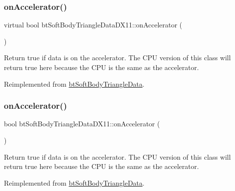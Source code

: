 \subsubsection{\texorpdfstring{on\+Accelerator()}{onAccelerator()}\hspace{0.1cm}{\footnotesize\ttfamily [1/2]}}
{\footnotesize\ttfamily virtual bool bt\+Soft\+Body\+Triangle\+Data\+D\+X11\+::on\+Accelerator (\begin{DoxyParamCaption}{ }\end{DoxyParamCaption})\hspace{0.3cm}{\ttfamily [virtual]}}

Return true if data is on the accelerator. The C\+PU version of this class will return true here because the C\+PU is the same as the accelerator. 

Reimplemented from \hyperlink{classbtSoftBodyTriangleData_a7e461faee6801a25e4ccdf108d55ed54}{bt\+Soft\+Body\+Triangle\+Data}.

\mbox{\label{classbtSoftBodyTriangleDataDX11_ae1dc56ae7688b61b271f2213296caf19}} 
\subsubsection{\texorpdfstring{on\+Accelerator()}{onAccelerator()}\hspace{0.1cm}{\footnotesize\ttfamily [2/2]}}
{\footnotesize\ttfamily bool bt\+Soft\+Body\+Triangle\+Data\+D\+X11\+::on\+Accelerator (\begin{DoxyParamCaption}{ }\end{DoxyParamCaption})\hspace{0.3cm}{\ttfamily [virtual]}}

Return true if data is on the accelerator. The C\+PU version of this class will return true here because the C\+PU is the same as the accelerator. 

Reimplemented from \hyperlink{classbtSoftBodyTriangleData_a7e461faee6801a25e4ccdf108d55ed54}{bt\+Soft\+Body\+Triangle\+Data}.

\mbox{\label{classbtSoftBodyTriangleDataDX11_af2bc183a8ee1ff160281d4039bcb9bb3}} 

